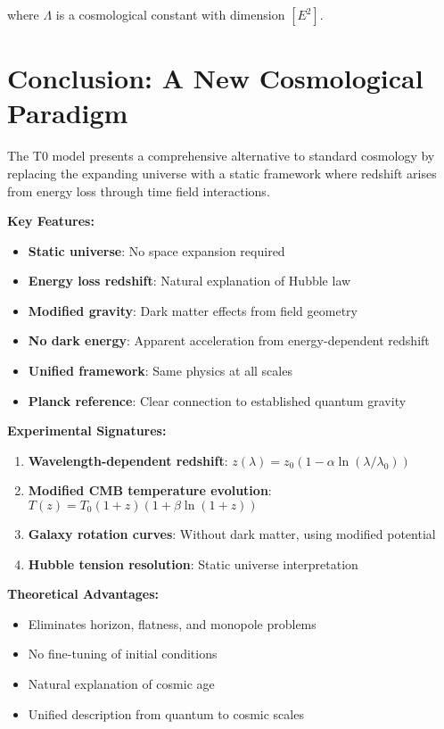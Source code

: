 \documentclass[12pt,a4paper]{report}
\begin{document}
where $\Lambda$ is a cosmological constant with dimension $[E^2]$.
	\section{Conclusion: A New Cosmological Paradigm}
	\label{sec:conclusion_cosmology}
	
	The T0 model presents a comprehensive alternative to standard cosmology by replacing the expanding universe with a static framework where redshift arises from energy loss through time field interactions.
	
	\textbf{Key Features:}
	\begin{itemize}
		\item \textbf{Static universe}: No space expansion required
		\item \textbf{Energy loss redshift}: Natural explanation of Hubble law
		\item \textbf{Modified gravity}: Dark matter effects from field geometry
		\item \textbf{No dark energy}: Apparent acceleration from energy-dependent redshift
		\item \textbf{Unified framework}: Same physics at all scales
		\item \textbf{Planck reference}: Clear connection to established quantum gravity
	\end{itemize}
	
	\textbf{Experimental Signatures:}
	\begin{enumerate}
		\item \textbf{Wavelength-dependent redshift}: $z(\lambda) = z_0(1 - \alpha \ln(\lambda/\lambda_0))$
		\item \textbf{Modified CMB temperature evolution}: $T(z) = T_0(1+z)(1 + \beta \ln(1+z))$
		\item \textbf{Galaxy rotation curves}: Without dark matter, using modified potential
		\item \textbf{Hubble tension resolution}: Static universe interpretation
	\end{enumerate}
	
	\textbf{Theoretical Advantages:}
	\begin{itemize}
		\item Eliminates horizon, flatness, and monopole problems
		\item No fine-tuning of initial conditions
		\item Natural explanation of cosmic age
		\item Unified description from quantum to cosmic scales
	\end{itemize}
	
\end{document}
